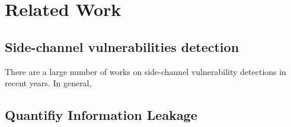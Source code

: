 \section{Related Work}
\subsection{Side-channel vulnerabilities detection}

There are a large number of works on side-channel vulnerability detections in recent years.
In general, 
\subsection{Quantifiy Information Leakage}